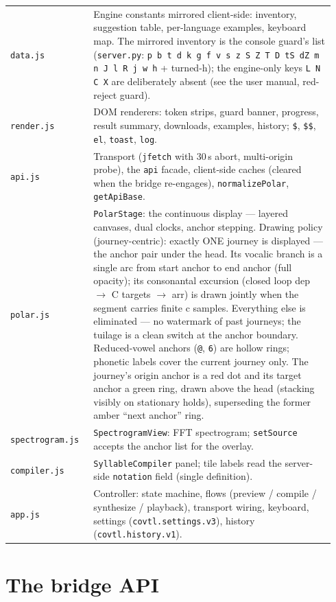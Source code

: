 \documentclass[11pt,a4paper]{article}
\begin{document}
\begin{longtable}{p{0.24\linewidth}p{0.70\linewidth}}
\texttt{data.js} & Engine constants mirrored client-side: inventory,
suggestion table, per-language examples, keyboard map. The mirrored
inventory is the console guard's list
(\texttt{server.py}: \texttt{p b t d k g f v s z S Z T D tS dZ m n J l
R j w h} + turned-h); the engine-only keys \texttt{L N C X} are
deliberately absent (see the user manual, red-reject guard). \\
\texttt{render.js} & DOM renderers: token strips, guard banner,
progress, result summary, downloads, examples, history; \texttt{\$},
\texttt{\$\$}, \texttt{el}, \texttt{toast}, \texttt{log}. \\
\texttt{api.js} & Transport (\texttt{jfetch} with 30\,s abort,
multi-origin probe), the \texttt{api} facade, client-side caches
(cleared when the bridge re-engages), \texttt{normalizePolar},
\texttt{getApiBase}. \\
\texttt{polar.js} & \texttt{PolarStage}: the continuous display ---
layered canvases, dual clocks, anchor stepping. Drawing policy
(journey-centric): exactly ONE journey is displayed --- the anchor pair
under the head. Its vocalic branch is a single arc from start anchor to
end anchor (full opacity); its consonantal excursion (closed loop dep
$\rightarrow$ C targets $\rightarrow$ arr) is drawn jointly when the
segment carries finite c samples. Everything else is eliminated --- no
watermark of past journeys; the tuilage is a clean switch at the anchor
boundary. Reduced-vowel anchors (\texttt{@}, \texttt{6}) are hollow
rings; phonetic labels cover the current journey only. The journey's
origin anchor is a red dot and its target anchor a green ring, drawn
above the head (stacking visibly on stationary holds), superseding the
former amber ``next anchor'' ring. \\
\texttt{spectrogram.js} & \texttt{SpectrogramView}: FFT spectrogram;
\texttt{setSource} accepts the anchor list for the overlay. \\
\texttt{compiler.js} & \texttt{SyllableCompiler} panel; tile labels read
the server-side \texttt{notation} field (single definition). \\
\texttt{app.js} & Controller: state machine, flows (preview / compile /
synthesize / playback), transport wiring, keyboard, settings
(\texttt{covtl.settings.v3}), history (\texttt{covtl.history.v1}). \\
\end{longtable}

\section{The bridge API}
\end{document}
